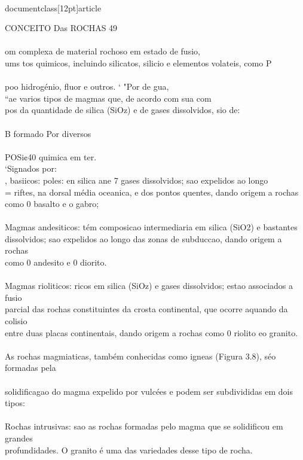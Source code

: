 \\documentclass[12pt]{article}
\begin{document}
CONCEITO Das ROCHAS 49\\
\\
om complexa de material rochoso em estado de fusio,\\
ums tos quimicos, incluindo silicatos, silicio e elementos volateis, como P\\
\\
poo hidrogénio, fluor e outros. ‘ "Por de gua,\\
“ae varios tipos de magmas que, de acordo com sua com\\
pos da quantidade de silica (SiOz) e de gases dissolvidos, sio de:\\
\\
B formado Por diversos\\
\\
POSi¢40 quimica em ter.\\
‘Signados por:\\
, basiicos: poles: en silica ane 7 gases dissolvidos; sao expelidos ao longo\\
= riftes, na dorsal média oceanica, e dos pontos quentes, dando origem a rochas\\
como 0 basalto e o gabro;\\
\\
Magmas andesiticos: tém composicao intermediaria em silica (SiO2) e bastantes\\
dissolvidos; sao expelidos ao longo das zonas de subduccao, dando origem a rochas\\
como 0 andesito e 0 diorito.\\
\\
Magmas rioliticos: ricos em silica (SiOz) e gases dissolvidos; estao associados a fusio\\
parcial das rochas constituintes da crosta continental, que ocorre aquando da colisio\\
entre duas placas continentais, dando origem a rochas como 0 riolito eo granito.\\
\\
As rochas magmiaticas, também conhecidas como igneas (Figura 3.8), séo formadas pela\\
\\
solidificagao do magma expelido por vulcées e podem ser subdivididas em dois tipos:\\
\\
Rochas intrusivas: sao as rochas formadas pelo magma que se solidificou em grandes\\
profundidades. O granito é uma das variedades desse tipo de rocha.\\
\end{document}
